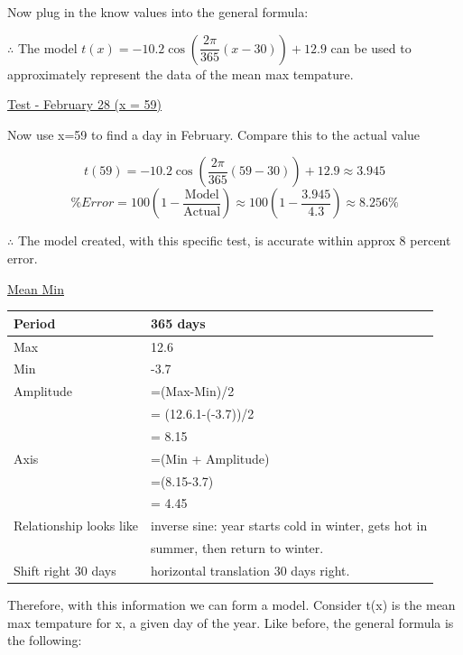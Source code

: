 \documentclass[12pt]{book}
\begin{document}
\begin{enumerate}
\begin{center}
    Now plug in the know values into the general formula:
\end{center}

$\therefore$ The model $\boxed{t(x) = -10.2\cos\left( \dfrac{2\pi}{365} (x - 30) \right) + 12.9}$ can be used to approximately represent the data of the mean max tempature.

\vspace{0.3cm}
\underline{Test - February 28 (x = 59)}

Now use x=59 to find a day in February. Compare this to the actual value

$$t(59) = -10.2\cos\left( \dfrac{2\pi}{365} (59 - 30) \right) + 12.9 \approx 3.945$$
\vspace{0.1cm}
$$\% Error = 100\left(1-\dfrac{\text{Model}}{\text{Actual}}\right) \approx 100\left(1-\dfrac{3.945}{4.3}\right) \approx \boxed{8.256\%}$$

\begin{center}
    $\therefore$ The model created, with this specific test, is accurate within approx 8 percent error.
\end{center}

\vspace{0.7cm}
\underline{Mean Min}

\vspace{0.3cm}
\begin{tabular}{|l|l|}
    \hline
    Period & 365 days \\
    \hline
    Max & 12.6 \\
    \hline
    Min & -3.7 \\
    \hline
    Amplitude & =(Max-Min)/2\\
    & = (12.6.1-(-3.7))/2 \\
    & = 8.15 \\
    \hline
    Axis & =(Min + Amplitude)\\
    & =(8.15-3.7) \\
    & = 4.45 \\
    \hline
    Relationship looks like & inverse sine: year starts cold in winter, gets hot in \\
    & summer, then return to winter. \\
    \hline
    Shift right 30 days & horizontal translation 30 days right. \\
    \hline
\end{tabular}

\vspace{1cm}
Therefore, with this information we can form a model. 
Consider t(x) is the mean max tempature for x, a given day of the year. 
Like before, the general formula is the following:


\end{enumerate}
\end{document}
